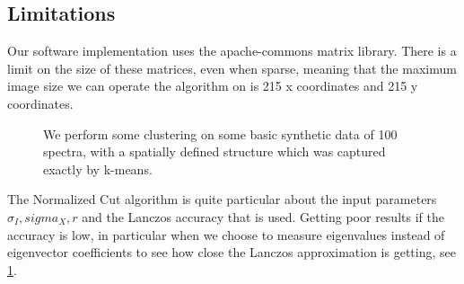 \documentclass[11pt,openany]{book}
\begin{document}
\subsection{Limitations}
Our software implementation uses the apache-commons matrix library. There is a limit on the size of these matrices, even when sparse, meaning that the maximum image size we can operate the algorithm on is 215 x coordinates and 215 y coordinates.  

\begin{figure}
    \centering
    
    \caption{We perform some clustering on some basic synthetic data of 100 spectra, with a spatially defined structure which was captured exactly by k-means.}
    \label{synthetic_data}
\end{figure}

The Normalized Cut algorithm is quite particular about the input parameters $\sigma_I, sigma_X, r$ and the Lanczos accuracy that is used. Getting poor results if the accuracy is low, in particular when we choose to measure eigenvalues instead of eigenvector coefficients to see how close the Lanczos approximation is getting, see \ref{synthetic_data}.
\end{document}
